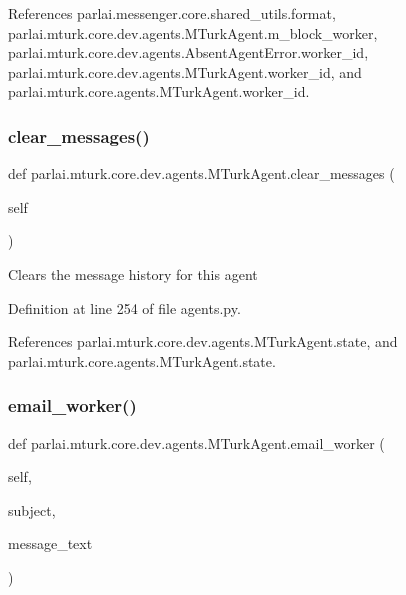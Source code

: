 References parlai.\+messenger.\+core.\+shared\+\_\+utils.\+format, parlai.\+mturk.\+core.\+dev.\+agents.\+M\+Turk\+Agent.\+m\+\_\+block\+\_\+worker, parlai.\+mturk.\+core.\+dev.\+agents.\+Absent\+Agent\+Error.\+worker\+\_\+id, parlai.\+mturk.\+core.\+dev.\+agents.\+M\+Turk\+Agent.\+worker\+\_\+id, and parlai.\+mturk.\+core.\+agents.\+M\+Turk\+Agent.\+worker\+\_\+id.

\mbox{\label{classparlai_1_1mturk_1_1core_1_1dev_1_1agents_1_1MTurkAgent_aaf5f9772de3c1f0c0efe0cf2dc98965d}} 
\subsubsection{\texorpdfstring{clear\+\_\+messages()}{clear\_messages()}}
{\footnotesize\ttfamily def parlai.\+mturk.\+core.\+dev.\+agents.\+M\+Turk\+Agent.\+clear\+\_\+messages (\begin{DoxyParamCaption}\item[{}]{self }\end{DoxyParamCaption})}

\begin{DoxyVerb}Clears the message history for this agent\end{DoxyVerb}
 

Definition at line 254 of file agents.\+py.



References parlai.\+mturk.\+core.\+dev.\+agents.\+M\+Turk\+Agent.\+state, and parlai.\+mturk.\+core.\+agents.\+M\+Turk\+Agent.\+state.

\mbox{\label{classparlai_1_1mturk_1_1core_1_1dev_1_1agents_1_1MTurkAgent_ae41f960fce1595f567e46aca27c654e5}} 
\subsubsection{\texorpdfstring{email\+\_\+worker()}{email\_worker()}}
{\footnotesize\ttfamily def parlai.\+mturk.\+core.\+dev.\+agents.\+M\+Turk\+Agent.\+email\+\_\+worker (\begin{DoxyParamCaption}\item[{}]{self,  }\item[{}]{subject,  }\item[{}]{message\+\_\+text }\end{DoxyParamCaption})}

